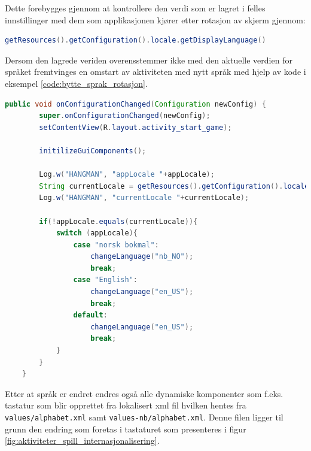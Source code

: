 Dette forebygges gjennom at kontrollere den verdi som er lagret i felles innstillinger med dem som applikasjonen kjører etter rotasjon av skjerm gjennom:
\begin{lstlisting}[language=Java]
getResources().getConfiguration().locale.getDisplayLanguage() 
\end{lstlisting}
Dersom den lagrede veriden overensstemmer ikke med den aktuelle verdien for språket fremtvinges en omstart av aktiviteten med nytt språk med hjelp av kode i eksempel \ref{code:bytte_sprak_rotasjon}.

\begin{lstlisting}[language=Java, caption=Språkkontroll etter rotasjon, label=code:bytte_sprak_rotasjon]
    public void onConfigurationChanged(Configuration newConfig) {
        super.onConfigurationChanged(newConfig);
        setContentView(R.layout.activity_start_game);

        initilizeGuiComponents();

        Log.w("HANGMAN", "appLocale "+appLocale);
        String currentLocale = getResources().getConfiguration().locale.getDisplayLanguage();
        Log.w("HANGMAN", "currentLocale "+currentLocale);

        if(!appLocale.equals(currentLocale)){
            switch (appLocale){
                case "norsk bokmal":
                    changeLanguage("nb_NO");
                    break;
                case "English":
                    changeLanguage("en_US");
                    break;
                default:
                    changeLanguage("en_US");
                    break;
            }
        }
    }
\end{lstlisting}


Etter at språk er endret endres også alle dynamiske komponenter som f.eks. tastatur som blir opprettet fra lokalisert xml fil hvilken hentes fra \texttt{values/alphabet.xml} samt \texttt{values-nb/alphabet.xml}. Denne filen ligger til grunn den endring som foretas i tastaturet som presenteres i figur \ref{fig:aktiviteter_spill_internasjonalisering}.

